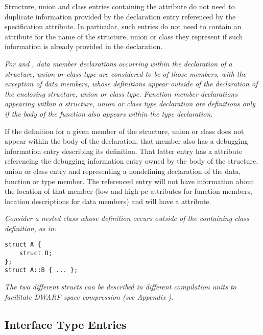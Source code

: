 Structure, union and class entries containing the
 attribute 
do not need to duplicate
information provided by the declaration entry referenced by the
specification attribute.  In particular, such entries do not
need to contain an attribute for the name of the structure,
union or class they represent if such information is already
provided in the declaration.

\textit{For  and , 
data 
member declarations occurring within
the declaration of a structure, union or class type are
considered to be  of those members, with
the exception of  data members, whose definitions
appear outside of the declaration of the enclosing structure,
union or class type. Function member declarations appearing
within a structure, union or class type declaration are
definitions only if the body of the function also appears
within the type declaration.}

If the definition for a given member of the structure, union
or class does not appear within the body of the declaration,
that member also has a debugging information entry describing
its definition. That latter entry has a 
 attribute 
referencing the debugging information entry
owned by the body of the structure, union or class entry and
representing a non\dash defining declaration of the data, function
or type member. The referenced entry will not have information
about the location of that member (low and high pc attributes
for function members, location descriptions for data members)
and will have a  attribute.

\textit{Consider a nested class whose 
definition occurs outside of the containing class definition, as in:}

\begin{lstlisting}[numbers=none]
struct A {
    struct B;
};
struct A::B { ... };
\end{lstlisting}

\textit{The two different structs can be described in 
different compilation units to 
facilitate DWARF space compression 
(see Appendix ).}

\subsection{Interface Type Entries}
\label{chap:interfacetypeentries}

